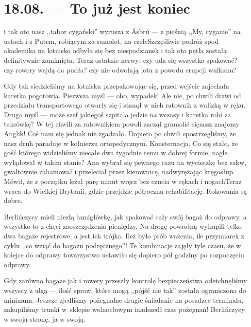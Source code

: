 \chapter*{18.08. --- To już jest koniec\textellipsis}

\textellipsis i tak oto nasz ,,tabor cygański'' wyrusza z Ásbrú --- z pieśnią ,,My, cyganie'' na ustach i z Putem, robiącym za samolot, na czele\textellipsis Szczęśliwie podróż spod akademika na lotnisko odbyła się bez niespodzianek i tak oto pętla została definitywnie zamknięta. Teraz ostatnie nerwy: czy uda się wszystko spakować? czy rowery wejdą do pudła? czy nie odwołają lotu z powodu erupcji wulkanu?

Gdy tak siedzieliśmy na lotnisku przepakowując się, przed wejście zajechała karetka pogotowia. Pierwsza myśl --- oho, wypadek! Ale nie, po chwili drzwi od przedziału transportowego otwarły się i stanął w nich ratownik z walizką w ręku. Druga myśl --- może szef jakiegoś szpitala jedzie na wczasy i karetka robi za taksówkę? W tej chwili za ratownikiem powoli zaczął gramolić się\textellipsis nasz znajomy Anglik! Coś nam się jednak nie zgadzało. Dopiero po chwili spostrzegliśmy, że nasz druh paraduje w kołnierzu ortopedycznym. Konsternacja. Co się stało, że gość którego widzieliśmy niecałe dwa tygodnie temu w dobrej formie, nagle wylądował w takim stanie? Ano wybrał się pewnego razu na wycieczkę bez sakw, gwałtownie zahamował i przeleciał przez kierownicę, nadwyrężając kręgosłup. Mówił, że z początku leżał parę minut wręcz bez czucia w rękach i nogach\textellipsis Teraz wraca do Wielkiej Brytanii, gdzie przejdzie półroczną rehabilitację. Rokowania są dobre.


\pagebreak

Berlińczycy mieli niezłą łamigłówkę, jak spakować cały swój bagaż do odprawy, a wszystko to z chęci zaoszczędzenia pieniędzy. Na drogę powrotną wykupili tylko dwa bagaże rejestrowe, a jest ich trójka. Ileż było prób ważenia, ile przymiarek z cyklu ,,co wziąć do bagażu podręcznego''! Te kombinacje zajęły tyle czasu, że w kolejce do odprawy towarzystwo ustawiło się dopiero pół godziny po rozpoczęciu odprawy.

Gdy zarówno bagaże jak i rowery przeszły kontrolę bezpieczeństwa odetchnęliśmy wszyscy z ulgą --- ilość spraw, które mogą ,,pójść nie tak'' została ograniczona do minimum. Jeszcze zjedliśmy pożegnalne drugie śniadanie na posadzce terminalu, zakupiliśmy trunki w~sklepie wolnocłowym i\textellipsis nadszedł czas pożegnań! Berlińczycy w swoją stronę, ja w swoją.

